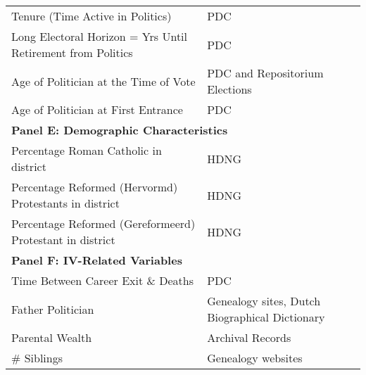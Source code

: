 \begin{table}[!ht]
\begin{tabular}{ll}
    Tenure (Time Active in Politics) & PDC \\
    Long Electoral Horizon = Yrs Until Retirement from Politics & PDC \\
    Age of Politician at the Time of Vote & PDC and Repositorium Elections \\
    Age of Politician at First Entrance & PDC \\
    \multicolumn{2}{l}{\textbf{Panel E: Demographic Characteristics}} \\ \hline
    Percentage Roman Catholic in district & HDNG \\
    Percentage Reformed (Hervormd) Protestants in district & HDNG \\
    Percentage Reformed (Gereformeerd) Protestant in district & HDNG \\
    \multicolumn{2}{l}{\textbf{Panel F: IV-Related Variables}} \\ \hline
    Time Between Career Exit \& Deaths & PDC \\
    Father Politician & Genealogy sites, Dutch Biographical Dictionary \\
    Parental Wealth & Archival Records \\
    \# Siblings & Genealogy websites
    \end{tabular}
\end{table}